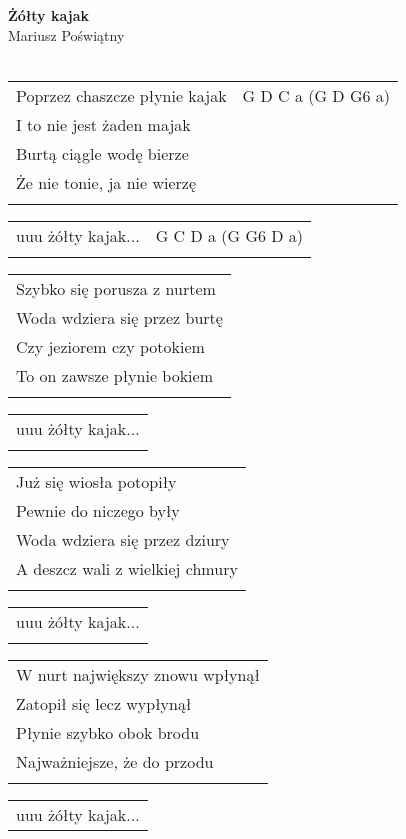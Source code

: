 \documentclass[a5paper]{article}
\begin{document}


\noindent
\noindent
\fontsize{12pt}{15pt}\selectfont
\textbf{Żółty kajak} \\
\fontsize{8pt}{10pt}\selectfont
Mariusz Poświątny \\ \\
\fontsize{10pt}{12pt}\selectfont
{}
\noindent
\begin{tabular}{@{}p{6.00cm}p{4cm}@{}}
Poprzez chaszcze płynie kajak & G D C a (G D G6 a) \\
I to nie jest żaden majak & \\
Burtą ciągle wodę bierze & \\
Że nie tonie, ja nie wierzę & \\\\
\end{tabular}

\begin{tabular}{@{}p{5.00cm}p{4cm}@{}}
uuu żółty kajak... & G C D a (G G6 D a) \\ \\
\end{tabular}

\noindent
\begin{tabular}{@{}p{7.50cm}@{}}
Szybko się porusza z nurtem \\ 
Woda wdziera się przez burtę \\
Czy jeziorem czy potokiem \\
To on zawsze płynie bokiem \\ \\
\end{tabular}

\begin{tabular}{@{}p{7.50cm}@{}}
uuu żółty kajak...  \\ \\
\end{tabular}

\noindent
\begin{tabular}{@{}p{7.50cm}@{}}
Już się wiosła potopiły \\
Pewnie do niczego były  \\
Woda wdziera się przez dziury  \\
A deszcz wali z wielkiej chmury \\ \\
\end{tabular}

\begin{tabular}{@{}p{7.50cm}@{}}
uuu żółty kajak... \\ \\
\end{tabular}

\noindent
\begin{tabular}{@{}p{7.50cm}@{}}
W nurt największy znowu wpłynął  \\
Zatopił się lecz wypłynął \\
Płynie szybko obok brodu \\
Najważniejsze, że do przodu \\ \\
\end{tabular}

\begin{tabular}{@{}p{7.50cm}@{}}
uuu żółty kajak... 
\end{tabular}
\end{document}
